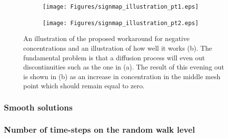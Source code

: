\begin{figure}[H]
\centering
\begin{subfigure}[t!]{0.48\textwidth}
 \texttt{[image: Figures/signmap\_illustration\_pt1.eps]}
 \caption{}
\end{subfigure}
\begin{subfigure}[t!]{0.48\textwidth}
 \texttt{[image: Figures/signmap\_illustration\_pt2.eps]}
 \caption{}
\end{subfigure}
\caption[Workaround for negative concentrations, illustration]{An illustration of the proposed workaround for negative concentrations and an illustration of how well it works (b). The fundamental problem is that a diffusion process will even out discontinuities such as the one in (a). The result of this evening out is shown in (b) as an increase in concentration in the middle mesh point which should remain equal to zero.}
\label{theory:signmap_illustration}
 \end{figure}

\subsubsection{Smooth solutions}


\subsubsection{Number of time-steps on the random walk level}

